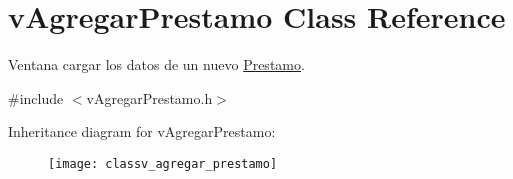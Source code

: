 \hypertarget{classv_agregar_prestamo}{}\section{v\+Agregar\+Prestamo Class Reference}
\label{classv_agregar_prestamo}


Ventana cargar los datos de un nuevo \hyperlink{class_prestamo}{Prestamo}.  




{\ttfamily \#include $<$v\+Agregar\+Prestamo.\+h$>$}

Inheritance diagram for v\+Agregar\+Prestamo\+:\begin{figure}[H]
\begin{center}
\leavevmode
\texttt{[image: classv\_agregar\_prestamo]}
\end{center}
\end{figure}
